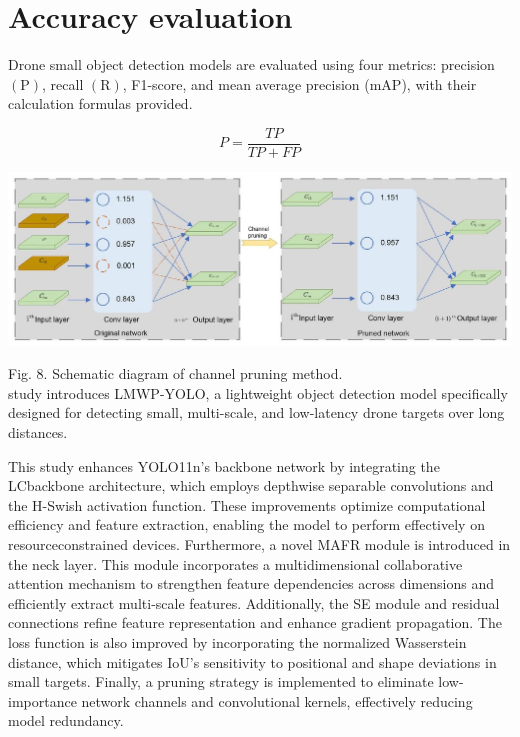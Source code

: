 \documentclass{article}
\begin{document}
\section*{Accuracy evaluation}
Drone small object detection models are evaluated using four metrics: precision $(\mathrm{P})$, recall $(\mathrm{R})$, F1-score, and mean average precision (mAP), with their calculation formulas provided.


\begin{equation*}
P=\frac{T P}{T P+F P} \tag{20}
\end{equation*}


\begin{center}
\includegraphics[max width=\textwidth]{2025_08_05_34f8389150f57116e76bg-09}
\end{center}

Fig. 8. Schematic diagram of channel pruning method.\\
study introduces LMWP-YOLO, a lightweight object detection model specifically designed for detecting small, multi-scale, and low-latency drone targets over long distances.

This study enhances YOLO11n's backbone network by integrating the LCbackbone architecture, which employs depthwise separable convolutions and the H-Swish activation function. These improvements optimize computational efficiency and feature extraction, enabling the model to perform effectively on resourceconstrained devices. Furthermore, a novel MAFR module is introduced in the neck layer. This module incorporates a multidimensional collaborative attention mechanism to strengthen feature dependencies across dimensions and efficiently extract multi-scale features. Additionally, the SE module and residual connections refine feature representation and enhance gradient propagation. The loss function is also improved by incorporating the normalized Wasserstein distance, which mitigates IoU's sensitivity to positional and shape deviations in small targets. Finally, a pruning strategy is implemented to eliminate low-importance network channels and convolutional kernels, effectively reducing model redundancy.
\end{document}
